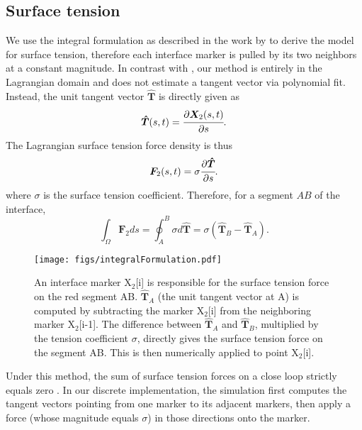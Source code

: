 \documentclass{jfm}
\begin{document}
\subsection{Surface tension}
We use the integral formulation as described in the work by \citet{surface_tension_review} to derive the model for surface tension, therefore each interface marker is pulled by its two neighbors at a constant magnitude. In contrast with \citep{surface_tension_still_tangent_applied_to_segment}, our method is entirely in the Lagrangian domain and does not estimate a tangent vector via polynomial fit. Instead, the unit tangent vector $\bm{\hat{T}}$ is directly given as
\begin{equation}
\bm{\hat{T}}(s, t) = \cfrac{\partial \bm{X}_2(s, t)}{\partial s}. 
\end{equation}
The Lagrangian surface tension force density is thus
\begin{equation}
\bm{F}_2(s,t) = \sigma \cfrac{\partial \bm{\hat{T}}}{\partial s}. 
\end{equation}
where $\sigma$ is the surface tension coefficient. 
Therefore, for a segment $AB$ of the interface, 
\begin{equation}
\int_{\Omega} \bm{F}_2 ds = \oint_{A}^{B} \sigma d \bm{\hat{T}} = \sigma (\bm{\hat{T}}_B - \bm{\hat{T}}_A).
\end{equation}
 \label{eq:tension}
\begin{figure}
    \centering
    \texttt{[image: figs/integralFormulation.pdf]}
    \caption{\label{fig:integralFormulation}
        An interface marker X$_2$[i] is responsible for the surface tension force on the red segment AB. $\bm{\hat{T}}_A$ (the unit tangent vector at A) is computed by subtracting the marker X$_2$[i] from the neighboring marker X$_2$[i-1]. The difference between $\bm{\hat{T}}_A$ and $\bm{\hat{T}}_B$, multiplied by the tension coefficient $\sigma$, directly gives the surface tension force on the segment AB. This is then numerically applied to point X$_2$[i]. 
    }
\end{figure}
Under this method, the sum of surface tension forces on a close loop strictly equals zero \citep{surface_tension_review}. In our discrete implementation, the simulation first computes the tangent vectors pointing from one marker to its adjacent markers, then apply a force (whose magnitude equals $\sigma$) in those directions onto the marker. 
\end{document}

